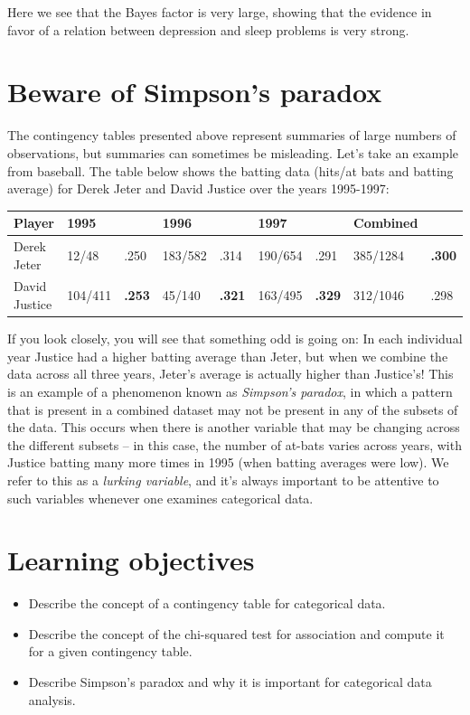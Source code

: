 \documentclass[12pt,]{book}
\providecommand{\tightlist}{%
  \setlength{\itemsep}{0pt}\setlength{\parskip}{0pt}}
\theoremstyle{definition}
\theoremstyle{definition}
\theoremstyle{definition}
\theoremstyle{remark}
\begin{document}
Here we see that the Bayes factor is very large, showing that the evidence in favor of a relation between depression and sleep problems is very strong.

\hypertarget{beware-of-simpsons-paradox}{%
\section{Beware of Simpson's paradox}\label{beware-of-simpsons-paradox}}

The contingency tables presented above represent summaries of large numbers of observations, but summaries can sometimes be misleading. Let's take an example from baseball. The table below shows the batting data (hits/at bats and batting average) for Derek Jeter and David Justice over the years 1995-1997:

\begin{longtable}[]{@{}lllllllll@{}}
\toprule
Player & 1995 & & 1996 & & 1997 & & Combined &\tabularnewline
\midrule
\endhead
Derek Jeter & 12/48 & .250 & 183/582 & .314 & 190/654 & .291 & 385/1284 & \textbf{.300}\tabularnewline
David Justice & 104/411 & \textbf{.253} & 45/140 & \textbf{.321} & 163/495 & \textbf{.329} & 312/1046 & .298\tabularnewline
\bottomrule
\end{longtable}

If you look closely, you will see that something odd is going on: In each individual year Justice had a higher batting average than Jeter, but when we combine the data across all three years, Jeter's average is actually higher than Justice's! This is an example of a phenomenon known as \emph{Simpson's paradox}, in which a pattern that is present in a combined dataset may not be present in any of the subsets of the data. This occurs when there is another variable that may be changing across the different subsets -- in this case, the number of at-bats varies across years, with Justice batting many more times in 1995 (when batting averages were low). We refer to this as a \emph{lurking variable}, and it's always important to be attentive to such variables whenever one examines categorical data.

\hypertarget{learning-objectives-11}{%
\section{Learning objectives}\label{learning-objectives-11}}

\begin{itemize}
\tightlist
\item
  Describe the concept of a contingency table for categorical data.
\item
  Describe the concept of the chi-squared test for association and compute it for a given contingency table.
\item
  Describe Simpson's paradox and why it is important for categorical data analysis.
\end{itemize}
\end{document}
